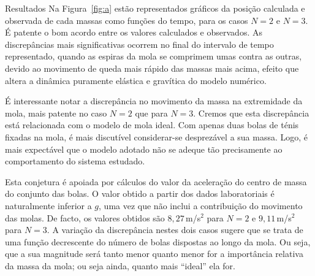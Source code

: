 \documentclass[final]{beamer}
\newlength{\colwidth}
\begin{document}
\begin{frame}[t]
\begin{columns}[t]
\begin{column}{\colwidth}

\begin{block}{Resultados}
Na Figura~\ref{fig:a}  estão representados gráficos da posição calculada e
observada de cada massas como funções do tempo, para os casos $N=2$ e $N=3$. É
patente o bom acordo entre os valores calculados e observados. As discrepâncias
mais significativas ocorrem no final do intervalo de tempo representado, quando
as espiras da mola se comprimem umas contra as outras, devido ao movimento de
queda mais rápido das massas mais acima, efeito que altera a dinâmica puramente
elástica e gravítica do modelo numérico.

É interessante notar a discrepância no movimento da massa na extremidade
da mola, mais patente no caso $N=2$ que para $N=3$. Cremos que esta discrepância
está relacionada com o modelo de mola ideal. Com apenas duas bolas de ténis
fixadas na mola, é mais discutível considerar-se desprezável a sua massa. Logo,
é mais expectável que o modelo adotado não se adeque tão precisamente ao
comportamento do sistema estudado.

Esta conjetura é apoiada por cálculos do valor da aceleração do centro de massa
do conjunto das bolas. O valor obtido a partir dos dados laboratoriais é
naturalmente inferior a $g$, uma vez que não inclui a contribuição do movimento
das molas. De facto, os valores obtidos são $8,27$\,m/s$^2$ para $N=2$ e
$9,11$\,m/s$^2$ para $N=3$.  A variação da discrepância nestes dois casos
sugere que se trata de uma função decrescente do número de bolas dispostas ao
longo da mola.  Ou seja, que a sua magnitude será tanto menor quanto menor for a
importância relativa da massa da mola; ou seja ainda, quanto mais ``ideal'' ela
for.
	

\end{block}
\end{column}
\end{columns}
\end{frame}
\end{document}
